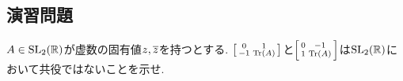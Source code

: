 \subsection{演習問題}
\begin{prob} \label{linalg:prob:not_conjugate}
$A\in\mr{SL}_{2}(\mb{R})$が虚数の固有値$z,\ovl{z}$を持つとする. $\sumib{0 & 1 \\ -1 & \tr{A}}$と$\sumib{0 & -1 \\ 1 & \tr{A} }$は$\mr{SL}_{2}(\mb{R})$において共役ではないことを示せ.
\end{prob}
\begin{hint}
\end{hint}
